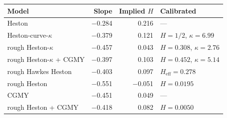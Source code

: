 \begin{tabular}{lrrl}
\toprule
Model & Slope & Implied $H$ & Calibrated\\
\midrule
Heston & $-$0.284 & 0.216 & ---\\
Heston-curve-$\kappa$ & $-$0.379 & 0.121 & $H = 1/2$, $\kappa = 6.99$\\
rough Heston-$\kappa$ & $-$0.457 & 0.043 & $H = 0.308$, $\kappa = 2.76$\\
rough Heston-$\kappa$ + CGMY & $-$0.397 & 0.103 & $H = 0.452$, $\kappa = 5.14$\\
rough Hawkes Heston & $-$0.403 & 0.097 & $H_{\mathrm{eff}} = 0.278$\\
\midrule
rough Heston & $-$0.551 & $-$0.051 & $H = 0.0195$\\
CGMY & $-$0.451 & 0.049 & ---\\
rough Heston + CGMY & $-$0.418 & 0.082 & $H = 0.0050$\\
\bottomrule
\end{tabular}

